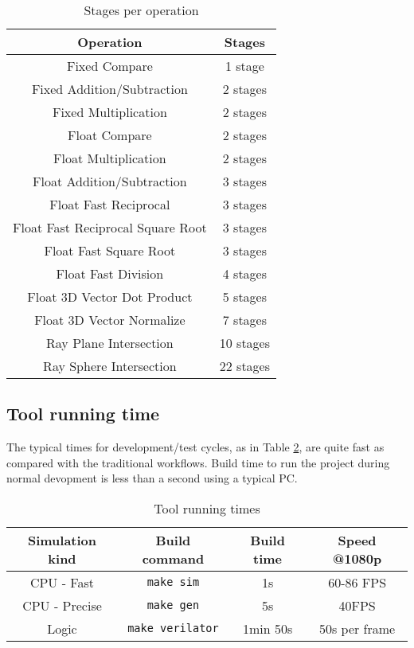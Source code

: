 \documentclass[conference]{IEEEtran}
\begin{document}
\begin{table}
\caption{Stages per operation}
\begin{center}
\begin{tabular}{|c|c|}
\hline \textbf{Operation}&  \textbf{Stages} \\
\hline Fixed Compare & 1 stage \\
\hline Fixed Addition/Subtraction & 2 stages \\
\hline Fixed Multiplication & 2 stages \\
\hline Float Compare & 2 stages \\
\hline Float Multiplication & 2 stages \\
\hline Float Addition/Subtraction & 3 stages \\
\hline Float Fast Reciprocal & 3 stages \\
\hline Float Fast Reciprocal Square Root & 3 stages \\
\hline Float Fast Square Root & 3 stages \\
\hline Float Fast Division & 4 stages \\
\hline Float 3D Vector Dot Product & 5 stages \\
\hline Float 3D Vector Normalize & 7 stages \\
\hline Ray Plane Intersection & 10 stages \\
\hline Ray Sphere Intersection & 22 stages \\
\hline
\end{tabular}
\label{tabopstages}
\end{center}
\end{table}


\subsection{Tool running time}

The typical times for development/test cycles, as in Table \ref{tabtimings}, are quite fast as compared with the traditional workflows. Build time to run the project during normal devopment is less than a second using a typical PC.

\begin{table}
\caption{Tool running times}
\begin{center}
\begin{tabular}{|c|c|c|c|}
\hline \textbf{Simulation kind} & \textbf{Build command}&  \textbf{Build time}& \textbf{Speed @1080p} \\
\hline CPU - Fast & \texttt{make sim} & 1s & 60-86 FPS \\
\hline CPU - Precise & \texttt{make gen} & 5s & 40FPS \\
\hline Logic & \texttt{make verilator} & 1min 50s & 50s per frame \\
\hline
\end{tabular}
\label{tabtimings}
\end{center}
\end{table}
\end{document}
